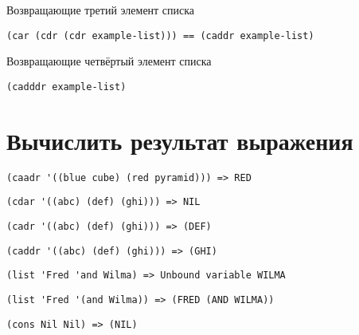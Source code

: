 \problem Возвращающие третий элемент списка

\begin{lstlisting}
(car (cdr (cdr example-list))) == (caddr example-list)
\end{lstlisting}


\problem Возвращающие четвёртый элемент списка

\begin{lstlisting}
(cadddr example-list)
\end{lstlisting}



\section{Вычислить результат выражения}

\problem \hfill

\begin{lstlisting}
(caadr '((blue cube) (red pyramid))) => RED
\end{lstlisting}


\problem \hfill

\begin{lstlisting}
(cdar '((abc) (def) (ghi))) => NIL
\end{lstlisting}


\problem \hfill

\begin{lstlisting}
(cadr '((abc) (def) (ghi))) => (DEF)
\end{lstlisting}


\problem \hfill

\begin{lstlisting}
(caddr '((abc) (def) (ghi))) => (GHI)
\end{lstlisting}


\problem \hfill

\begin{lstlisting}
(list 'Fred 'and Wilma) => Unbound variable WILMA
\end{lstlisting}


\problem \hfill

\begin{lstlisting}
(list 'Fred '(and Wilma)) => (FRED (AND WILMA))
\end{lstlisting}


\problem \hfill

\begin{lstlisting}
(cons Nil Nil) => (NIL)
\end{lstlisting}


